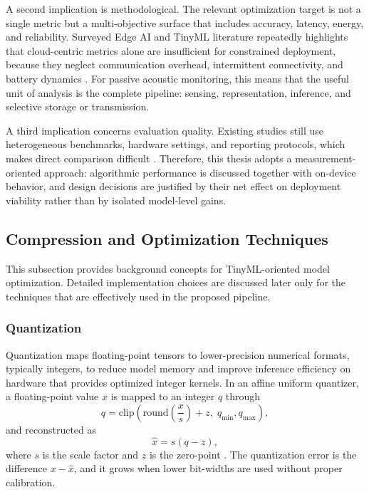 \documentclass[a4paper,singleside,12pt]{report} %
\begin{document}
	A second implication is methodological. The relevant optimization target is not a single metric but a multi-objective surface that includes accuracy, latency, energy, and reliability. Surveyed Edge AI and TinyML literature repeatedly highlights that cloud-centric metrics alone are insufficient for constrained deployment, because they neglect communication overhead, intermittent connectivity, and battery dynamics \cite{abadade2023tinymlsurvey,singh2023edgeaisurvey}. For passive acoustic monitoring, this means that the useful unit of analysis is the complete pipeline: sensing, representation, inference, and selective storage or transmission.

	A third implication concerns evaluation quality. Existing studies still use heterogeneous benchmarks, hardware settings, and reporting protocols, which makes direct comparison difficult \cite{abadade2023tinymlsurvey}. Therefore, this thesis adopts a measurement-oriented approach: algorithmic performance is discussed together with on-device behavior, and design decisions are justified by their net effect on deployment viability rather than by isolated model-level gains.
	\subsection{Compression and Optimization Techniques}
	This subsection provides background concepts for TinyML-oriented model optimization. Detailed implementation choices are discussed later only for the techniques that are effectively used in the proposed pipeline.

	\subsubsection{Quantization}
	Quantization maps floating-point tensors to lower-precision numerical formats, typically integers, to reduce model memory and improve inference efficiency on hardware that provides optimized integer kernels. In an affine uniform quantizer, a floating-point value \(x\) is mapped to an integer \(q\) through
	\begin{equation}
		q = \mathrm{clip}\!\left(\mathrm{round}\!\left(\frac{x}{s}\right)+z,\;q_{\min},q_{\max}\right),
	\end{equation}
	and reconstructed as
	\begin{equation}
		\hat{x}=s(q-z),
	\end{equation}
	where \(s\) is the scale factor and \(z\) is the zero-point \cite{wuint8quant2020}. The quantization error is the difference \(x-\hat{x}\), and it grows when lower bit-widths are used without proper calibration.
\end{document}
